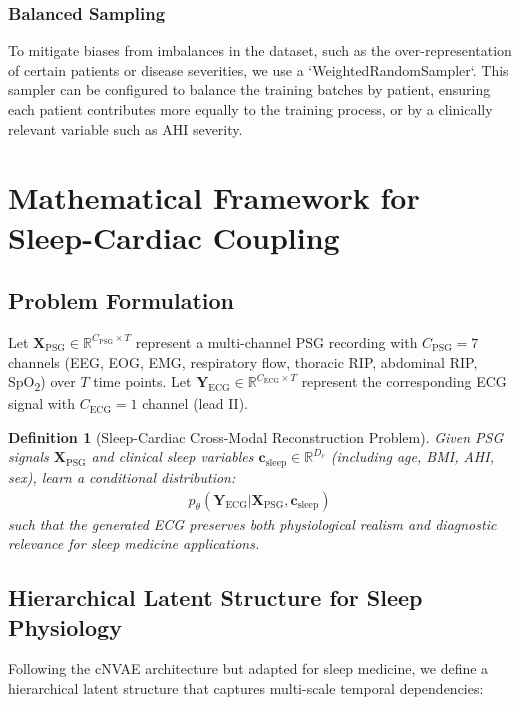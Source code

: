 \documentclass[11pt,en]{elegantpaper}
\newtheorem{definition}{Definition}
\begin{document}
\subsubsection{Balanced Sampling}
To mitigate biases from imbalances in the dataset, such as the over-representation of certain patients or disease severities, we use a `WeightedRandomSampler`. This sampler can be configured to balance the training batches by patient, ensuring each patient contributes more equally to the training process, or by a clinically relevant variable such as AHI severity.

\section{Mathematical Framework for Sleep-Cardiac Coupling}

\subsection{Problem Formulation}

Let $\mathbf{X}_{\text{PSG}} \in \mathbb{R}^{C_{\text{PSG}} \times T}$ represent a multi-channel PSG recording with $C_{\text{PSG}} = 7$ channels (EEG, EOG, EMG, respiratory flow, thoracic RIP, abdominal RIP, SpO\textsubscript{2}) over $T$ time points. Let $\mathbf{Y}_{\text{ECG}} \in \mathbb{R}^{C_{\text{ECG}} \times T}$ represent the corresponding ECG signal with $C_{\text{ECG}} = 1$ channel (lead II).

\begin{definition}[Sleep-Cardiac Cross-Modal Reconstruction Problem]
Given PSG signals $\mathbf{X}_{\text{PSG}}$ and clinical sleep variables $\mathbf{c}_{\text{sleep}} \in \mathbb{R}^{D_c}$ (including age, BMI, AHI, sex), learn a conditional distribution:
\begin{align}
p_\theta(\mathbf{Y}_{\text{ECG}} | \mathbf{X}_{\text{PSG}}, \mathbf{c}_{\text{sleep}})
\end{align}
such that the generated ECG preserves both physiological realism and diagnostic relevance for sleep medicine applications.
\end{definition}

\subsection{Hierarchical Latent Structure for Sleep Physiology}

Following the cNVAE architecture but adapted for sleep medicine, we define a hierarchical latent structure that captures multi-scale temporal dependencies:
\end{document}
